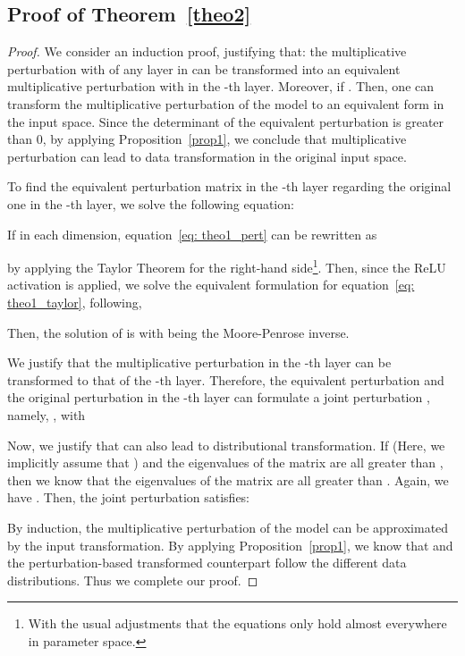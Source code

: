 \documentclass{article} \usepackage{iclr2022_conference,times}
\def\eqref#1{equation~\ref{#1}}
\begin{document}
\subsection{Proof of Theorem~\ref{theo2}} \label{app: proof2}
\begin{proof}
We consider an induction proof, justifying that: the multiplicative perturbation with  of any layer in  can be transformed into an equivalent multiplicative perturbation with  in the -th layer. Moreover,  if . Then, one can transform the multiplicative perturbation of the model to an equivalent form in the input space. Since the determinant of the equivalent perturbation is greater than 0, by applying Proposition~\ref{prop1}, we conclude that multiplicative perturbation can lead to data transformation in the original input space. 

To find the equivalent perturbation matrix  in the -th layer regarding the original one  in the -th layer, we solve the following equation:

If  in each dimension, \eqref{eq: theo1_pert} can be rewritten as

by applying the Taylor Theorem for the right-hand side\footnote{With the usual adjustments that the equations only hold almost everywhere in parameter space.}. Then, since the ReLU activation is applied, we solve the equivalent formulation for \eqref{eq: theo1_taylor}, following, 

Then, the solution of  is  with  being the Moore-Penrose inverse.  

We justify that the multiplicative perturbation in the -th layer can be transformed to that of the -th layer. Therefore, the equivalent perturbation  and the original perturbation in the -th layer can formulate a joint perturbation , namely, , with 


Now, we justify that  can also lead to distributional transformation. If  (Here, we implicitly assume that ) and the eigenvalues of the matrix  are all greater than , then we know that the eigenvalues of the matrix  are all greater than . Again, we have . {Then, the joint perturbation  satisfies:
}

 

By induction, the multiplicative perturbation of the model can be approximated by the input transformation. By applying Proposition~\ref{prop1}, we know that  and the perturbation-based transformed counterpart follow the different data distributions. Thus we complete our proof.
\end{proof}
\end{document}
